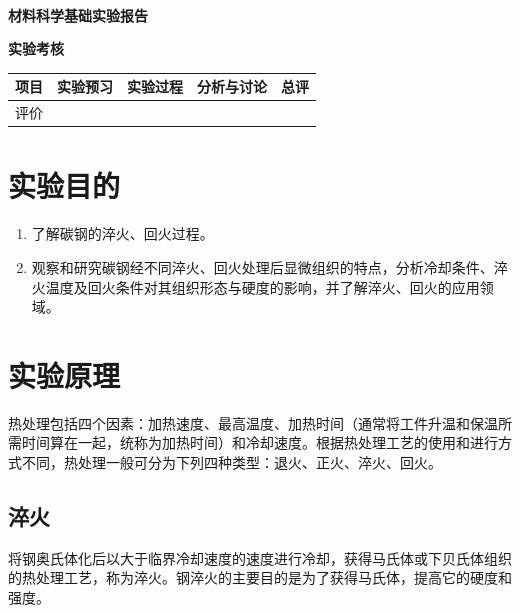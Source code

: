 \documentclass[a4paper,utf8]{article}
\begin{document}
\begin{center}
    {\mbox{}\\[7em]\bfseries\songti%
    材料科学基础实验报告}\\[34mm]
    {\bfseries\songti
    实验考核\\[3mm]
    \extrarowheight=3mm
    \begin{tabularx}{150mm}{|X|X|X|X|X|}\hline
        \hfil 项目 \hfil  & \hfil 实验预习 \hfil & \hfil 实验过程 \hfil & \hfil 分析与讨论 \hfil & \hfil 总评 \hfil \\[3mm] \hline
        \hfil 评价 \hfil &  &  &  &  \\[3mm] \hline
    \end{tabularx}
    }
\end{center}\newpage
\section{实验目的}
    \begin{enumerate}
        \item 了解碳钢的淬火、回火过程。
        \item 观察和研究碳钢经不同淬火、回火处理后显微组织的特点，分析冷却条件、淬火温度及回火条件对其组织形态与硬度的影响，并了解淬火、回火的应用领域。
    \end{enumerate}
\section{实验原理}%
    热处理包括四个因素：加热速度、最高温度、加热时间（通常将工件升温和保温所需时间算在一起，统称为加热时间）和冷却速度。根据热处理工艺的使用和进行方式不同，热处理一般可分为下列四种类型：退火、正火、淬火、回火。\par
    \subsection{淬火}
        将钢奥氏体化后以大于临界冷却速度的速度进行冷却，获得马氏体或下贝氏体组织的热处理工艺，称为淬火。钢淬火的主要目的是为了获得马氏体，提高它的硬度和强度。
\end{document}
